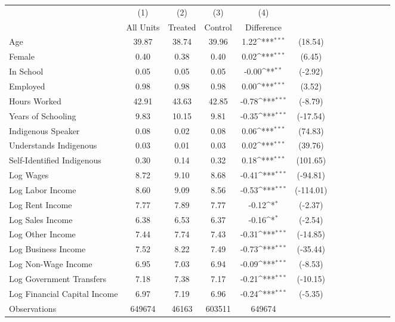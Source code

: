 {
\def\sym#1{\ifmmode^{#1}\else\(^{#1}\)\fi}
\begin{tabular}{l*{4}{ccc}}
\hline\hline
                    &\multicolumn{1}{c}{(1)}&\multicolumn{1}{c}{(2)}&\multicolumn{1}{c}{(3)}&\multicolumn{1}{c}{(4)}         &            \\
                    &   All Units&     Treated&     Control&  Difference         &            \\
\hline
Age                 &       39.87&       38.74&       39.96&        1.22\sym{***}&     (18.54)\\
Female              &        0.40&        0.38&        0.40&        0.02\sym{***}&      (6.45)\\
In School           &        0.05&        0.05&        0.05&       -0.00\sym{**} &     (-2.92)\\
Employed            &        0.98&        0.98&        0.98&        0.00\sym{***}&      (3.52)\\
Hours Worked        &       42.91&       43.63&       42.85&       -0.78\sym{***}&     (-8.79)\\
Years of Schooling  &        9.83&       10.15&        9.81&       -0.35\sym{***}&    (-17.54)\\
Indigenous Speaker  &        0.08&        0.02&        0.08&        0.06\sym{***}&     (74.83)\\
Understands Indigenous&        0.03&        0.01&        0.03&        0.02\sym{***}&     (39.76)\\
Self-Identified Indigenous&        0.30&        0.14&        0.32&        0.18\sym{***}&    (101.65)\\
Log Wages           &        8.72&        9.10&        8.68&       -0.41\sym{***}&    (-94.81)\\
Log Labor Income    &        8.60&        9.09&        8.56&       -0.53\sym{***}&   (-114.01)\\
Log Rent Income     &        7.77&        7.89&        7.77&       -0.12\sym{*}  &     (-2.37)\\
Log Sales Income    &        6.38&        6.53&        6.37&       -0.16\sym{*}  &     (-2.54)\\
Log Other Income    &        7.44&        7.74&        7.43&       -0.31\sym{***}&    (-14.85)\\
Log Business Income &        7.52&        8.22&        7.49&       -0.73\sym{***}&    (-35.44)\\
Log Non-Wage Income &        6.95&        7.03&        6.94&       -0.09\sym{***}&     (-8.53)\\
Log Government Transfers&        7.18&        7.38&        7.17&       -0.21\sym{***}&    (-10.15)\\
Log Financial Capital Income&        6.97&        7.19&        6.96&       -0.24\sym{***}&     (-5.35)\\
\hline
Observations        &      649674&       46163&      603511&      649674         &            \\
\hline\hline
\end{tabular}
}
